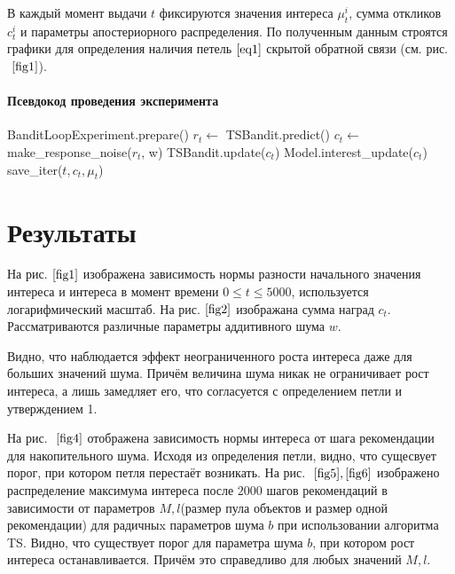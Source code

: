 \documentclass[12pt, twoside]{article}
\begin{document}
В каждый момент выдачи $t$ фиксируются значения интереса $\mu_t^i$, сумма откликов $c_t^i$ и параметры апостериорного распределения. 
По полученным данным строятся графики для определения наличия петель $\eqref{eq1}$ скрытой обратной связи (см. рис.$~\ref{fig1}$).

\paragraph{Псевдокод проведения эксперимента}
\begin{algorithmic}
  \STATE BanditLoopExperiment.prepare()
    \STATE $r_t \leftarrow$ TSBandit.predict()
    \STATE $c_t \leftarrow$ make\_response\_noise($r_t$, w)
    \STATE TSBandit.update($c_t$)
    \STATE Model.interest\_update($c_t$)
    \STATE save\_iter($t, c_t, \mu_t$)
  \ENDFOR
\end{algorithmic}

\section{Результаты}
На рис.$~\ref{fig1}$ изображена зависимость нормы разности начального значения интереса и интереса в момент времени $0 \leq t \leq 5000$, используется логарифмический масштаб. 
На рис.$~\ref{fig2}$ изображана сумма наград $c_t$.
Рассматриваются различные параметры аддитивного шума $w$.

Видно, что наблюдается эффект неограниченного роста интереса даже для больших значений шума. 
Причём величина шума никак не ограничивает рост интереса, а лишь замедляет его, что согласуется с определением петли и утверждением 1. 

На рис. $~\ref{fig4}$ отображена зависимость нормы интереса от шага рекомендации для накопительного шума. 
Исходя из определения петли, видно, что сущесвует порог, при котором петля перестаёт возникать. 
На рис. $~\ref{fig5},\ref{fig6}$ изображено распределение максимума интереса после $2000$ шагов рекомендаций в зависимости от параметров $M, l$(размер пула объектов и размер одной рекомендации) для радичныx параметров шума $b$ при использовании алгоритма TS.
Видно, что существует порог для параметра шума $b$, при котором рост интереса останавливается. 
Причём это справедливо для любых значений $M, l$.
\end{document}
